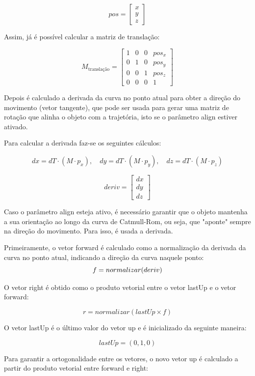 \documentclass[12pt, a4paper]{article}
\begin{document}
$$
{pos} = \begin{bmatrix} x \\ y \\ z \end{bmatrix}
$$

Assim, já é possível calcular a matriz de translação:

$$
M_{\text{translação}} =
\begin{bmatrix}
    1 & 0   & 0  & pos_x \\
    0  & 1 & 0 & pos_y \\
    0 & 0  & 1  & pos_z \\
    0  & 0 & 0    & 1
\end{bmatrix}
$$

Depois é calculado a derivada da curva no ponto atual para obter a direção do movimento
(vetor tangente), que pode ser usada para gerar uma matriz de rotação que alinha o objeto
com a trajetória, isto se o parâmetro align estiver ativado.

Para calcular a derivada faz-se os seguintes cálculos:

$$
dx = {dT} \cdot ({M} \cdot {p}_x), \quad
dy = {dT} \cdot ({M} \cdot {p}_y), \quad
dz = {dT} \cdot ({M} \cdot {p}_z)
$$

\[
{deriv} = \begin{bmatrix} dx \\ dy \\ dz \end{bmatrix}
\]

Caso o parâmetro align esteja ativo, é necessário garantir que o objeto mantenha a sua
orientação ao longo da curva de Catmull-Rom, ou seja, que "aponte" sempre na direção do
movimento. Para isso, é usada a derivada.

Primeiramente, o vetor forward é calculado como a normalização da derivada da curva no
ponto atual, indicando a direção da curva naquele ponto:
$$
f = normalizar(deriv) \\
$$

O vetor right é obtido como o produto vetorial entre o vetor lastUp e o vetor forward:

$$
r = normalizar(lastUp \times f)
$$

O vetor lastUp é o último valor do vetor up e é inicializado da seguinte maneira:

$$
lastUp=(0,1,0)
$$

Para garantir a ortogonalidade entre os vetores, o novo vetor up é calculado a
partir do produto vetorial entre forward e right:
\end{document}
